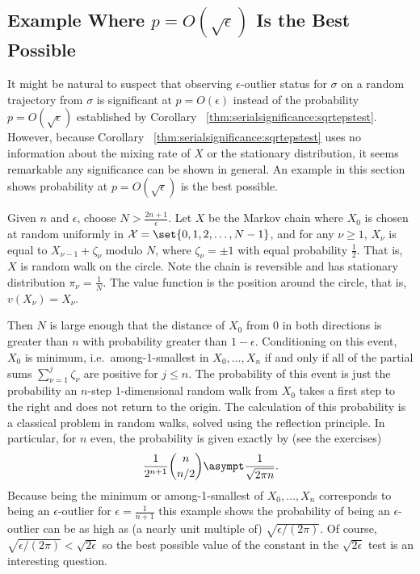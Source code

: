 \documentclass[12pt]{article}
\begin{document}
\subsection*{Example Where \( p = O(\sqrt{\epsilon}) \) Is the Best
Possible}

It might be natural to suspect that observing \( \epsilon \)-outlier
status for \( \sigma \) on a random trajectory from \( \sigma \) is
significant at \( p = O(\epsilon) \) instead of the probability \( p = O
(\sqrt{\epsilon}) \) established by Corollary~%
\ref{thm:serialsignificance:sqrtepstest}.  However, because Corollary~%
\ref{thm:serialsignificance:sqrtepstest} uses no information about the
mixing rate of \( X \) or the stationary distribution, it seems
remarkable any significance can be shown in general.  An example in this
section shows probability at \( p = O( \sqrt{\epsilon}) \) is the best
possible.

Given \( n \) and \( \epsilon \), choose \( N > \frac{2n+1}{\epsilon} \).
Let \( X \) be the Markov chain where \( X_0 \) is chosen at random
uniformly in \( \mathcal{X} = \set{0, 1, 2, \dots , N-1} \), and for any
\( \nu \ge 1 \), \( X_{\nu} \) is equal to \( X_{\nu-1} + \zeta_{\nu} \)
modulo \( N \), where \( \zeta_{\nu} = \pm 1 \) with equal probability \(
\frac{1}{2} \).  That is, \( X \) is random walk on the circle.  Note
the chain is reversible and has stationary distribution \( \pi_\nu =
\frac{1}{N} \).  %
The value function is the position around the circle, that is, \( v (X_{\nu})
= X_{\nu} \).  %

Then \( N \) is large enough that the distance of \( X_0 \) from \( 0 \)
in both directions is greater than \( n \) with probability greater than
\( 1 - \epsilon \).  Conditioning on this event, \( X_0 \) is minimum,
i.e.\ among-1-smallest in \( X_0, \dots , X_n \) if and only if all of
the partial sums \( \sum\limits_{\nu=1}^{j} \zeta_\nu \) are positive
for \( j \le n \).  The probability of this event is just the
probability an \( n \)-step \( 1 \)-dimensional random walk from \( X_0 \)
takes a first step to the right and does not return to the origin.  The
calculation of this probability is a classical problem in random walks,
solved using the reflection principle.  In particular, for \( n \) even,
the probability is given exactly by (see the exercises)
\[
    \frac{1}{2^{n+1}}\binom{n}{n/2} \asympt \frac{1}{\sqrt{2 \pi n}}.
\] Because being the minimum or among-1-smallest of \( X_0, \dots , X_n \)
corresponds to being an \( \epsilon \)-outlier for \( \epsilon = \frac{1}
{n+1} \) this example shows the probability of being an \( \epsilon \)-outlier
can be as high as (a nearly unit multiple of) \( \sqrt{\epsilon/(2\pi)} \).
Of course, \( \sqrt{\epsilon/ (2\pi)} < \sqrt{2\epsilon} \) so the best
possible value of the constant in the \( \sqrt{2\epsilon} \) test is an
interesting question.
\end{document}
